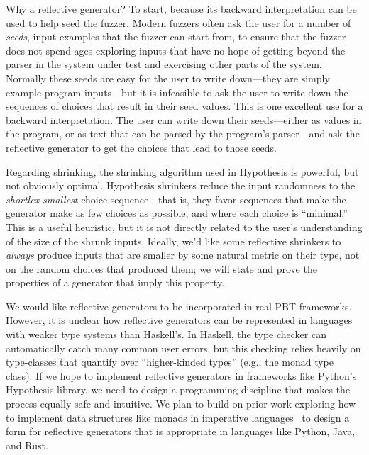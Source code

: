 Why a reflective generator?
To start,
because its backward interpretation can be used to help seed the fuzzer.
Modern fuzzers often
ask the user for a number of {\em seeds}, input examples that the fuzzer can start from,
to ensure that the fuzzer does not spend ages exploring
inputs that have no hope of getting beyond the parser in the system
under test and exercising other parts of the system. Normally these seeds are easy
for the user to write down---they are simply example program inputs---but
it is infeasible to ask the user to write down the sequences of choices that
result in their seed values.
This is one excellent use for a
backward interpretation. The user can write down their seeds---either as values
in the program, or as text that can be parsed by the program's parser---and
ask the reflective generator to get the choices that lead to those seeds.

Regarding shrinking, the shrinking algorithm used in Hypothesis is powerful,
but not obviously optimal. Hypothesis shrinkers reduce the input
randomness to the
{\em shortlex smallest} choice sequence---that is, they favor
sequences that make the
generator make as few choices as possible, and where each choice is
``minimal.''  This is a useful heuristic, but it is not directly
related to the user's understanding of the size of the shrunk
inputs. Ideally, we'd like some
reflective shrinkers to {\em always} produce inputs that are smaller by some
natural metric on their type, not on the random choices that produced them; we
will state and prove the properties of a generator that imply this
property. 


%
We would like reflective generators to be incorporated in
real PBT frameworks.
%
However, it is unclear
how reflective generators can be
represented in languages with weaker type systems than Haskell's. In
Haskell, the type checker can automatically catch many
common user errors, but this checking relies heavily on type-classes that
quantify over ``higher-kinded types'' (e.g., the monad type class). If
we hope to implement
reflective generators in frameworks like Python's Hypothesis library, we need to
design a programming discipline that makes the process equally safe and
intuitive. We plan to build on prior work exploring how to implement data structures
like monads in imperative
languages~\cite{brachthauser_representing_2021, delaat_pymonad_nodate} to design
a form for reflective generators that is appropriate in languages like
Python, Java, and Rust.

